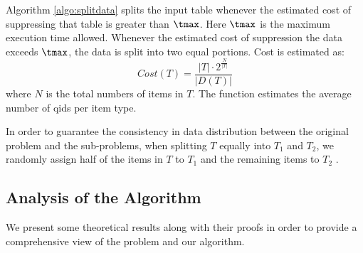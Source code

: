 Algorithm \ref{algo:splitdata}
splits the input table whenever the estimated cost of
suppressing that table is greater than $\tmax$.
Here $\tmax$ is the maximum execution time allowed.
Whenever the estimated cost of suppression the data exceeds
$\tmax$, the data is split into two equal portions.
Cost is estimated as:
\begin{equation}\label{eq:costfunc}
Cost(T)=\frac{|T| \cdot 2^\frac{N}{|T|}}{|D(T)|} 
\end{equation}
where $N$ is the total numbers of items in $T$. 
The function estimates the average number of qids per item type. 

In order to guarantee the consistency in data distribution between the 
original problem and the sub-problems, when splitting $T$ equally 
into $T_1$ and $T_2$, we randomly assign half of the items in 
$T$ to $T_1$ and the remaining items to $T_2$ .

\subsection{Analysis of the Algorithm}
\label{sec:analysis}

%
We present some theoretical results along with their proofs
in order to provide a comprehensive view of the problem and our algorithm.

